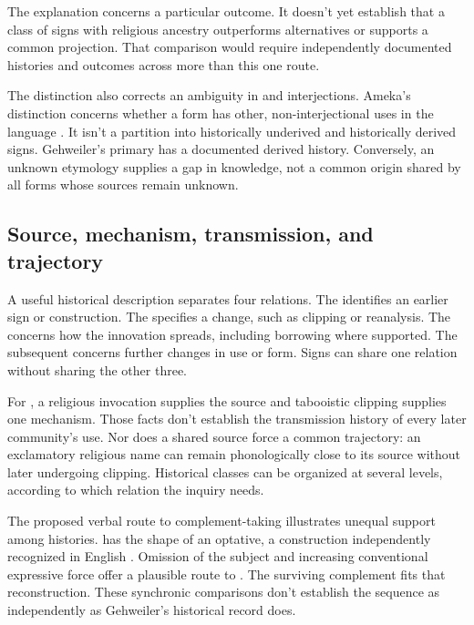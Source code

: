 \documentclass[12pt]{article}
\begin{document}
The explanation concerns a particular outcome. It doesn't yet establish
that a class of signs with religious ancestry outperforms alternatives
or supports a common projection. That comparison would require independently
documented histories and outcomes across more than this one route.

The distinction also corrects an ambiguity in  and
 interjections. Ameka's distinction concerns whether
a form has other, non-interjectional uses in the language
\citep[105--106]{ameka1992}. It isn't a partition into historically
underived and historically derived signs. Gehweiler's primary
 has a documented derived history. Conversely, an unknown
etymology supplies a gap in knowledge, not a common origin shared by
all forms whose sources remain unknown.

\subsection{Source, mechanism, transmission, and trajectory}

A useful historical description separates four relations. The
 identifies an earlier sign or construction. The
 specifies a change, such as clipping or reanalysis.
The  concerns how the innovation spreads,
including borrowing where supported. The subsequent 
concerns further changes in use or form. Signs can share one relation
without sharing the other three.

For , a religious invocation supplies the source and
tabooistic clipping supplies one mechanism. Those facts don't establish
the transmission history of every later community's use. Nor does a
shared source force a common trajectory: an exclamatory religious name
can remain phonologically close to its source without later undergoing
clipping. Historical classes can be organized at several
levels, according to which relation the inquiry needs.

The proposed verbal route to complement-taking  illustrates
unequal support among histories.  has the shape
of an optative, a construction independently recognized in English
\citep[944]{HuddlestonPullum2002}. Omission of the subject and increasing
conventional expressive force offer a plausible route to . The surviving complement fits that reconstruction. These synchronic
comparisons don't establish the sequence as independently as Gehweiler's
historical record does.
\end{document}
